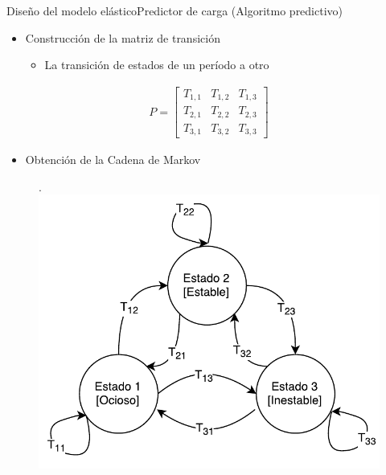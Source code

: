 \begin{frame}{Diseño del modelo elástico}{Predictor de carga (Algoritmo predictivo)}
\begin{multicols}{2}
\begin{itemize}
	\item Construcción de la matriz de transición
		\begin{itemize}
			\item La transición de estados de un período a otro
		\end{itemize}
\end{itemize}
\begin{center}
\begin{align*}
	P =
	\begin{bmatrix}
		T_{1,1} & T_{1,2} & T_{1,3} \\
		T_{2,1} & T_{2,2} & T_{2,3} \\
		T_{3,1} & T_{3,2} & T_{3,3}
	\end{bmatrix}	
\end{align*}
\end{center}

\vspace*{10cm}

\begin{itemize}
	\item Obtención de la Cadena de Markov
\end{itemize}
\begin{figure}[ht!].
  \centering
    \includegraphics[scale=0.35]{images/CadenaMarkovPredictiva.pdf}
\end{figure}
\end{multicols}
\end{frame}

